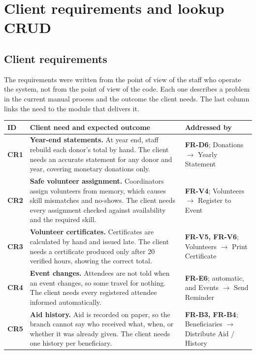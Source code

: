 \section{Client requirements and lookup CRUD}

\subsection{Client requirements}

The requirements were written from the point of view of the staff who operate the system, not from the point of view of the code. Each one describes a problem in the current manual process and the outcome the client needs. The last column links the need to the module that delivers it.

\begin{table}[H]
\centering
\scriptsize
\renewcommand{\arraystretch}{1.2}
\begin{tabularx}{\textwidth}{@{}L{0.05\textwidth}YL{0.28\textwidth}@{}}
\toprule
\textbf{ID} & \textbf{Client need and expected outcome} & \textbf{Addressed by} \\
\midrule
\textbf{CR1} & \textbf{Year-end statements.} At year end, staff rebuild each donor's total by hand. The client needs an accurate statement for any donor and year, covering monetary donations only. & \textbf{FR-D6}; Donations \(\rightarrow\) Yearly Statement \\
\addlinespace[1.5pt]
\textbf{CR2} & \textbf{Safe volunteer assignment.} Coordinators assign volunteers from memory, which causes skill mismatches and no-shows. The client needs every assignment checked against availability and the required skill. & \textbf{FR-V4}; Volunteers \(\rightarrow\) Register to Event \\
\addlinespace[1.5pt]
\textbf{CR3} & \textbf{Volunteer certificates.} Certificates are calculated by hand and issued late. The client needs a certificate produced only after 20 verified hours, showing the correct total. & \textbf{FR-V5, FR-V6}; Volunteers \(\rightarrow\) Print Certificate \\
\addlinespace[1.5pt]
\textbf{CR4} & \textbf{Event changes.} Attendees are not told when an event changes, so some travel for nothing. The client needs every registered attendee informed automatically. & \textbf{FR-E6}; automatic, and Events \(\rightarrow\) Send Reminder \\
\addlinespace[1.5pt]
\textbf{CR5} & \textbf{Aid history.} Aid is recorded on paper, so the branch cannot say who received what, when, or whether it was already given. The client needs one history per beneficiary. & \textbf{FR-B3, FR-B4}; Beneficiaries \(\rightarrow\) Distribute Aid / History \\

\end{tabularx}
\end{table}
